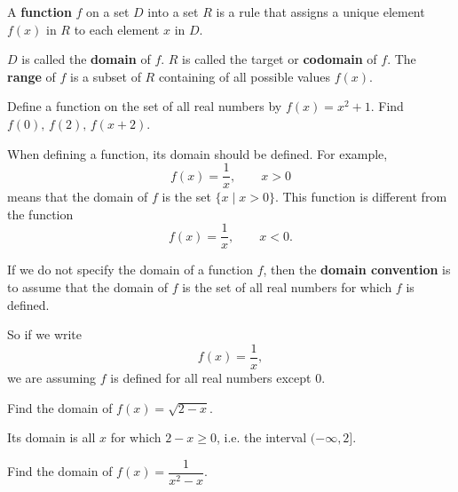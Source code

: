 \documentclass[../main.tex]{subfiles}
\begin{document}
  A \textbf{function} $f$ on a set $D$ into a set $R$ is a rule that assigns a unique element $f(x)$ in $R$ to each element $x$ in $D$.

  $D$ is called the \textbf{domain} of $f$. $R$ is called the target or \textbf{codomain} of $f$. The \textbf{range} of $f$ is a subset of $R$ containing of all possible values $f(x)$.

  \begin{figure}[H]
    \centering
    \begin{subfigure}{0.3\textwidth}
      \centering
      
    \end{subfigure}
    \begin{subfigure}{0.3\textwidth}
      \centering
      
    \end{subfigure}
  \end{figure}

  \begin{example}
    Define a function on the set of all real numbers by $f(x)=x^2+1$. Find $f(0), \, f(2), \, f(x+2)$.
  \end{example}

  When defining a function, its domain should be defined. For example,
  \[
    f(x) = \frac{1}{x}, \qquad x > 0
  \]
  means that the domain of $f$ is the set $\{x \mid x > 0\}$. This function is different from the function
  \[
    f(x) = \frac{1}{x}, \qquad x < 0.
  \]

  If we do not specify the domain of a function $f$, then the \textbf{domain convention} is to assume that the domain of $f$ is the set of all real numbers for which $f$ is defined.

  So if we write
  \[
    f(x)=\frac{1}{x},
  \]
  we are assuming $f$ is defined for all real numbers except $0$.


  \begin{example}
    Find the domain of $f(x) = \sqrt{2-x}$.
  \end{example}
  \begin{solution}
    Its domain is all $x$ for which $2-x \ge 0$, i.e. the interval $(-\infty, 2]$.
  \end{solution}

  \begin{example}
    Find the domain of $f(x) = \dfrac{1}{x^2 - x}$.
  \end{example}

\end{document}
